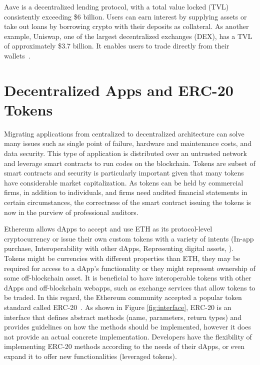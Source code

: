\begin{example}
	Aave is a decentralized lending protocol, with a total value locked (TVL) consistently exceeding \$6 billion. Users can earn interest by supplying assets or take out loans by borrowing crypto with their deposits as collateral. As another example, Uniswap, one of the largest decentralized exchanges (DEX), has a TVL of approximately \$3.7 billion. It enables users to trade directly from their wallets~\cite{theblock2024}.
\end{example}

\section{Decentralized Apps and ERC-20 Tokens}
Migrating applications from centralized to decentralized architecture can solve many issues such as single point of failure, hardware and maintenance costs, and data security. This type of application is distributed over an untrusted network and leverage smart contracts to run codes on the blockchain. Tokens are subset of smart contracts and security is particularly important given that many tokens have considerable market capitalization. As tokens can be held by commercial firms, in addition to individuals, and firms need audited financial statements in certain circumstances, the correctness of the smart contract issuing the tokens is now in the purview of professional auditors.

Ethereum allows dApps to accept and use ETH as its protocol-level cryptocurrency or issue their own custom tokens with a variety of intents (\eg In-app purchase, Interoperability with other dApps, Representing digital assets, \etc). Tokens might be currencies with different properties than ETH, they may be required for access to a dApp's functionality or they might represent ownership of some off-blockchain asset. It is beneficial to have interoperable tokens with other dApps and off-blockchain webapps, such as exchange services that allow tokens to be traded. In this regard, the Ethereum community accepted a popular token standard called ERC-20~\cite{Interface}. As shown in Figure \ref{fig:interface}, ERC-20 is an interface that defines abstract methods (name, parameters, return types) and provides guidelines on how the methods should be implemented, however it does not provide an actual concrete implementation. Developers have the flexibility of implementing ERC-20 methods according to the needs of their dApps, or even expand it to offer new functionalities (\eg leveraged tokens).

